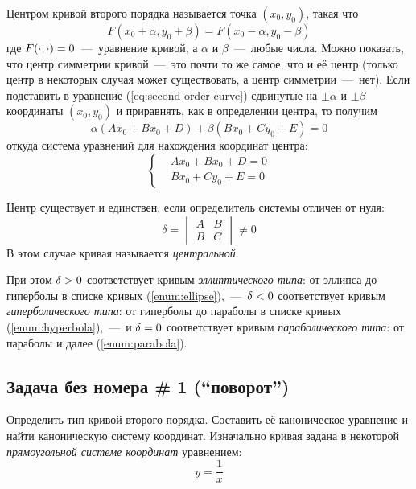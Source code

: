 \documentclass[a4paper,12pt]{article}
\begin{document}
  Центром кривой второго порядка называется точка $(x_0, y_0)$, такая что
  \[
    F(x_0 + \alpha, y_0 + \beta) = F(x_0 - \alpha, y_0 - \beta)
  \]
  где $F(\cdot, \cdot) \hm= 0$~---~уравнение кривой, а $\alpha$ и $\beta$~---~любые числа.
  Можно показать, что центр симметрии кривой~---~это почти то же самое, что и её центр (только центр в некоторых случая может существовать, а центр симметрии~---~нет).
  Если подставить в уравнение (\ref{eq:second-order-curve}) сдвинутые на $\pm \alpha$ и $\pm \beta$ координаты $(x_0, y_0)$ и приравнять, как в определении центра, то получим
  \[
    \alpha (Ax_0 + Bx_0 + D) + \beta (Bx_0 + Cy_0 + E) = 0
  \]
  откуда система уравнений для нахождения координат центра:
  \begin{equation}\label{eq:second-order-curve-center}
    \left\{
      \begin{aligned}
        &Ax_0 + Bx_0 + D = 0\\
        &Bx_0 + Cy_0 + E = 0
      \end{aligned}
    \right.
  \end{equation}
  
  Центр существует и единствен, если определитель системы отличен от нуля:
  \[
    \delta = \begin{vmatrix}A & B \\ B & C\end{vmatrix} \not= 0
  \]
  В этом случае кривая называется \emph{центральной}.
  
  При этом $\delta \hm> 0$ соответствует кривым \emph{эллиптического типа}: от эллипса до гиперболы в списке кривых (\ref{enum:ellipse}),~---~$\delta \hm< 0$ соответствует кривым \emph{гиперболического типа}: от гиперболы до параболы в списке кривых (\ref{enum:hyperbola}),~---~и $\delta \hm= 0$ соответствует кривым \emph{параболического типа}: от параболы и далее (\ref{enum:parabola}).
  
  
  \subsection{Задача без номера \# 1 (``поворот'')}
  
  Определить тип кривой второго порядка.
  Составить её каноническое уравнение и найти каноническую систему координат.
  Изначально кривая задана в некоторой \emph{прямоугольной системе координат} уравнением:
  \begin{equation}\label{eq:problem-no-number}
    y = \frac{1}{x}
  \end{equation}
  
\end{document}
